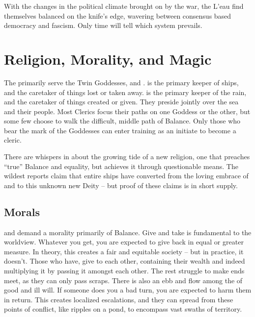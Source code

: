 \documentclass[blue]{GL2020}
\begin{document}
With the changes in the political climate brought on by the war, the L'eau find themselves balanced on the knife's edge, wavering between consensus based democracy and fascism. Only time will tell which system prevails.

\section*{Religion, Morality, and Magic}
The \pShippies{} primarily serve the Twin Goddesses, \cEbb{} and \cFlow{}. \cEbbFull{\MYname} is the primary keeper of ships, and the caretaker of things lost or taken away. \cFlowFull{\MYname} is the primary keeper of the rain, and the caretaker of things created or given. They preside jointly over the sea and their people. Most Clerics focus their paths on one Goddess or the other, but some few choose to walk the difficult, middle path of Balance. Only those who bear the mark of the Goddesses can enter training as an initiate to become a cleric.

There are whispers in \pShip{} about the growing tide of a new religion, one that preaches ``true'' Balance and equality, but achieves it through questionable means. The wildest reports claim that entire ships have converted from the loving embrace of \cEbb{} and \cFlow{} to this unknown new Deity -- but proof of these claims is in short supply.

\subsection*{Morals}
\cEbb{} and \cFlow{} demand a morality primarily of Balance. Give and take is fundamental to the \pShip{} worldview. Whatever you get, you are expected to give back in equal or greater measure. In theory, this creates a fair and equitable society -- but in practice, it doesn't. Those who have, give to each other, containing their wealth and indeed multiplying it by passing it amongst each other. The rest struggle to make ends meet, as they can only pass scraps. 
There is also an ebb and flow among the \pShippies{} of good and ill will. If someone does you a bad turn, you are expected to harm them in return. This creates localized escalations, and they can spread from these points of conflict, like ripples on a pond, to encompass vast swaths of \pShip{} territory.
\end{document}
